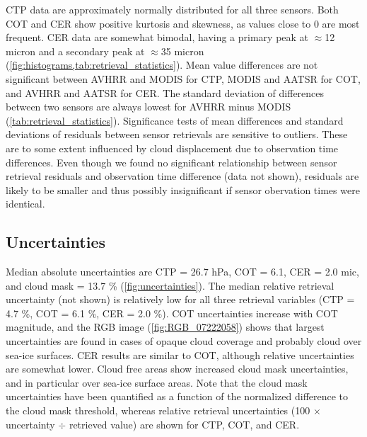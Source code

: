 CTP data are approximately normally distributed for all three sensors. Both COT and CER show positive kurtosis and skewness, as values close to 0 are most frequent. CER data are somewhat bimodal, having a primary peak at $\approx$12 micron and a secondary peak at $\approx$35 micron (\cref{fig:histograms,tab:retrieval_statistics}). Mean value differences are not significant between AVHRR and MODIS for CTP, MODIS and AATSR for COT, and AVHRR and AATSR for CER. The standard deviation of differences between two sensors are always lowest for AVHRR minus MODIS (\cref{tab:retrieval_statistics}). Significance tests of mean differences and standard deviations of residuals between sensor retrievals are sensitive to outliers. These are to some extent influenced by cloud displacement due to observation time differences. Even though we found no significant relationship between sensor retrieval residuals and observation time difference (data not shown), residuals are likely to be smaller and thus possibly insignificant if sensor obervation times were identical.
 
\subsection{Uncertainties}

Median absolute uncertainties are CTP = 26.7 hPa, COT = 6.1, CER = 2.0 mic, and cloud mask = 13.7 \% (\cref{fig:uncertainties}). The median relative retrieval uncertainty (not shown) is relatively low for all three retrieval variables (CTP = 4.7 \%, COT = 6.1 \%, CER = 2.0 \%). COT uncertainties increase with COT magnitude, and the RGB image (\cref{fig:RGB_07222058}) shows that largest uncertainties are found in cases of opaque cloud coverage and probably cloud over sea-ice surfaces. CER results are similar to COT, although relative uncertainties are somewhat lower. Cloud free areas show increased cloud mask uncertainties, and in particular over sea-ice surface areas. Note that the cloud mask uncertainties have been quantified as a function of the normalized difference to the cloud mask threshold, whereas relative retrieval uncertainties (100 $\times$ uncertainty $\div$ retrieved value) are shown for CTP, COT, and CER. 

